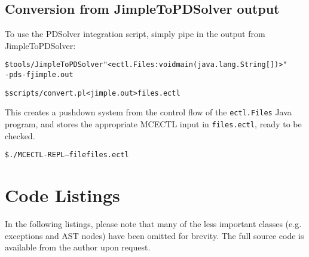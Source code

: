 \documentclass[11pt]{article}
\theoremstyle{definition}
\begin{document}
\subsection{Conversion from JimpleToPDSolver output}

To use the PDSolver integration script, simply pipe in the output from JimpleToPDSolver:
\begin{alltt}
\$ tools/JimpleToPDSolver "<ectl.Files: void main(java.lang.String[])>" 
                         -pds -f jimple.out

\$ scripts/convert.pl < jimple.out > files.ectl
\end{alltt}

This creates a pushdown system from the control flow of the \texttt{ectl.Files}
Java program, and stores the appropriate MCECTL input in \texttt{files.ectl},
ready to be checked.

\begin{alltt}
\$ ./MCECTL-REPL --file files.ectl
\end{alltt}

\section{Code Listings}

In the following listings, please note that many of the less important classes
(e.g. exceptions and AST nodes) have been omitted for brevity. The full source
code is available from the author upon request.
\end{document}

